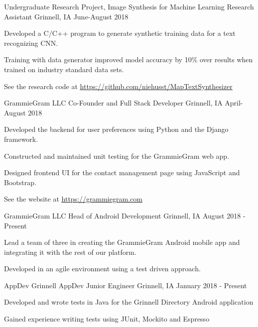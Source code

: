 \documentclass[12pt, a4paper]{awesome-cv}
\begin{document}
\begin{cventries}
  \cventry
    {Undergraduate Research Project, Image Synthesis for Machine Learning}
    {Research Assistant}
    {Grinnell, IA}
    {June-August 2018}
    {
      \begin{cvitems}
        \item {Developed a C/C++ program to generate synthetic training data for a text recognizing CNN.}
        \item{Training with data generator improved model accuracy by 10\% over results when trained on industry standard data sets.}
	\item{See the research code at \underline{\href{https://github.com/niehusst/MapTextSynthesizer}{https://github.com/niehusst/MapTextSynthesizer}}}
      \end{cvitems}
    }


  \cventry
    {GrammieGram LLC}
    {Co-Founder and Full Stack Developer}
    {Grinnell, IA}
    {April-August 2018}
    {
      \begin{cvitems}
        \item {Developed the backend for user preferences using Python and the Django framework.}
        \item {Constructed and maintained unit testing for the GrammieGram web app.}
        \item {Designed frontend UI for the contact management page using JavaScript and Bootstrap.}
	\item {See the website at \underline{\href{https://grammiegram.com}{https://grammiegram.com}}}
      \end{cvitems}
    }

  \cventry
    {GrammieGram LLC}
    {Head of Android Development}
    {Grinnell, IA}
    {August 2018 - Present}
    {
      \begin{cvitems}
        \item {Lead a team of three in creating the GrammieGram Android mobile app and integrating it with the rest of our platform.}
	\item {Developed in an agile environment using a test driven approach.}
      \end{cvitems}
    }

  \cventry
    {AppDev Grinnell}
    {AppDev Junior Engineer}
    {Grinnell, IA}
    {January 2018 - Present}
    {
      \begin{cvitems}
        \item {Developed and wrote tests in Java for the Grinnell Directory Android application}
	\item {Gained experience writing tests using JUnit, Mockito and Espresso}
      \end{cvitems}
    }

\end{cventries}
\end{document}
